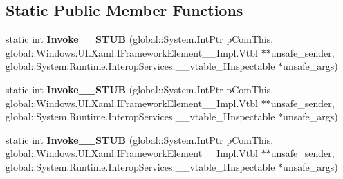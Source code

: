 \subsection*{Static Public Member Functions}
\begin{DoxyCompactItemize}
\item 
\mbox{\label{struct_windows_1_1_foundation_1_1_typed_event_handler___a___windows___u_i___xaml___framework_ele872ac08da67cec047eb0ef56a7d78c65_a3150c22101e5080d714123eb373de7fa}} 
static int {\bfseries Invoke\+\_\+\+\_\+\+S\+T\+UB} (global\+::\+System.\+Int\+Ptr p\+Com\+This, global\+::\+Windows.\+U\+I.\+Xaml.\+I\+Framework\+Element\+\_\+\+\_\+\+Impl.\+Vtbl $\ast$$\ast$unsafe\+\_\+sender, global\+::\+System.\+Runtime.\+Interop\+Services.\+\_\+\+\_\+vtable\+\_\+\+I\+Inspectable $\ast$unsafe\+\_\+args)
\item 
\mbox{\label{struct_windows_1_1_foundation_1_1_typed_event_handler___a___windows___u_i___xaml___framework_ele872ac08da67cec047eb0ef56a7d78c65_a3150c22101e5080d714123eb373de7fa}} 
static int {\bfseries Invoke\+\_\+\+\_\+\+S\+T\+UB} (global\+::\+System.\+Int\+Ptr p\+Com\+This, global\+::\+Windows.\+U\+I.\+Xaml.\+I\+Framework\+Element\+\_\+\+\_\+\+Impl.\+Vtbl $\ast$$\ast$unsafe\+\_\+sender, global\+::\+System.\+Runtime.\+Interop\+Services.\+\_\+\+\_\+vtable\+\_\+\+I\+Inspectable $\ast$unsafe\+\_\+args)
\item 
\mbox{\label{struct_windows_1_1_foundation_1_1_typed_event_handler___a___windows___u_i___xaml___framework_ele872ac08da67cec047eb0ef56a7d78c65_a3150c22101e5080d714123eb373de7fa}} 
static int {\bfseries Invoke\+\_\+\+\_\+\+S\+T\+UB} (global\+::\+System.\+Int\+Ptr p\+Com\+This, global\+::\+Windows.\+U\+I.\+Xaml.\+I\+Framework\+Element\+\_\+\+\_\+\+Impl.\+Vtbl $\ast$$\ast$unsafe\+\_\+sender, global\+::\+System.\+Runtime.\+Interop\+Services.\+\_\+\+\_\+vtable\+\_\+\+I\+Inspectable $\ast$unsafe\+\_\+args)
\item 
\mbox{\label{struct_windows_1_1_foundation_1_1_typed_event_handler___a___windows___u_i___xaml___framework_ele872ac08da67cec047eb0ef56a7d78c65_a3150c22101e5080d714123eb373de7fa}} 
$$
\end{DoxyCompactItemize}
